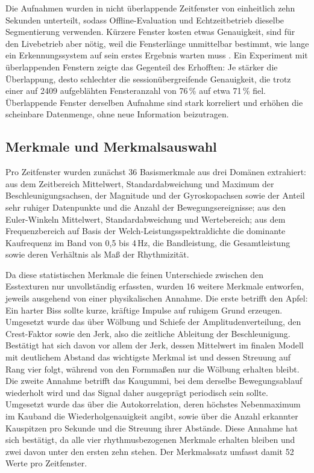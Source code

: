 \documentclass[11pt]{article}
\begin{document}
Die Aufnahmen wurden in nicht überlappende Zeitfenster von einheitlich zehn Sekunden
unterteilt, sodass Offline-Evaluation und Echtzeitbetrieb dieselbe Segmentierung verwenden.
Kürzere Fenster kosten etwas Genauigkeit, sind für den Livebetrieb aber nötig, weil die
Fensterlänge unmittelbar bestimmt, wie lange ein Erkennungssystem auf sein erstes Ergebnis
warten muss \citep[S.~33:10]{Bulling2014}. Ein Experiment mit überlappenden Fenstern zeigte
das Gegenteil des Erhofften: Je stärker die Überlappung, desto schlechter die
sessionübergreifende Genauigkeit, die trotz einer auf 2409 aufgeblähten Fensteranzahl von
76\,\% auf etwa 71\,\% fiel. Überlappende Fenster derselben Aufnahme sind stark korreliert
und erhöhen die scheinbare Datenmenge, ohne neue Information beizutragen.

\subsection{Merkmale und Merkmalsauswahl}

Pro Zeitfenster wurden zunächst 36 Basismerkmale aus drei Domänen extrahiert: aus dem
Zeitbereich Mittelwert, Standardabweichung und Maximum der Beschleunigungsachsen, der
Magnitude und der Gyroskopachsen sowie der Anteil sehr ruhiger Datenpunkte und die Anzahl
der Bewegungsereignisse; aus den Euler-Winkeln Mittelwert, Standardabweichung und
Wertebereich; aus dem Frequenzbereich auf Basis der Welch-Leistungsspektraldichte die
dominante Kaufrequenz im Band von 0,5 bis 4\,Hz, die Bandleistung, die Gesamtleistung sowie
deren Verhältnis als Maß der Rhythmizität.

Da diese statistischen Merkmale die feinen Unterschiede zwischen den Esstexturen nur
unvollständig erfassten, wurden 16 weitere Merkmale entworfen, jeweils ausgehend von einer
physikalischen Annahme. Die erste betrifft den Apfel: Ein harter Biss sollte kurze,
kräftige Impulse auf ruhigem Grund erzeugen. Umgesetzt wurde das über Wölbung und Schiefe
der Amplitudenverteilung, den Crest-Faktor sowie den Jerk, also die zeitliche Ableitung der
Beschleunigung. Bestätigt hat sich davon vor allem der Jerk, dessen Mittelwert im finalen
Modell mit deutlichem Abstand das wichtigste Merkmal ist und dessen Streuung auf Rang vier
folgt, während von den Formmaßen nur die Wölbung erhalten bleibt. Die zweite Annahme
betrifft das Kaugummi, bei dem derselbe Bewegungsablauf wiederholt wird und das Signal
daher ausgeprägt periodisch sein sollte. Umgesetzt wurde das über die Autokorrelation,
deren höchstes Nebenmaximum im Kauband die Wiederholgenauigkeit angibt, sowie über die
Anzahl erkannter Kauspitzen pro Sekunde und die Streuung ihrer Abstände. Diese Annahme hat
sich bestätigt, da alle vier rhythmusbezogenen Merkmale erhalten bleiben und zwei davon
unter den ersten zehn stehen. Der Merkmalssatz umfasst damit 52 Werte pro Zeitfenster.
\end{document}
